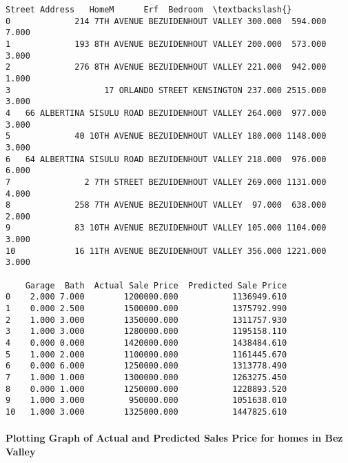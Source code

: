             \begin{tcolorbox}[breakable, size=fbox, boxrule=.5pt, pad at break*=1mm, opacityfill=0]
\begin{Verbatim}[commandchars=\\\{\}]
                                  Street Address   HomeM      Erf  Bedroom  \textbackslash{}
0             214 7TH AVENUE BEZUIDENHOUT VALLEY 300.000  594.000    7.000
1             193 8TH AVENUE BEZUIDENHOUT VALLEY 200.000  573.000    3.000
2             276 8TH AVENUE BEZUIDENHOUT VALLEY 221.000  942.000    1.000
3                   17 ORLANDO STREET KENSINGTON 237.000 2515.000    3.000
4   66 ALBERTINA SISULU ROAD BEZUIDENHOUT VALLEY 264.000  977.000    3.000
5             40 10TH AVENUE BEZUIDENHOUT VALLEY 180.000 1148.000    3.000
6   64 ALBERTINA SISULU ROAD BEZUIDENHOUT VALLEY 218.000  976.000    6.000
7               2 7TH STREET BEZUIDENHOUT VALLEY 269.000 1131.000    4.000
8             258 7TH AVENUE BEZUIDENHOUT VALLEY  97.000  638.000    2.000
9             83 10TH AVENUE BEZUIDENHOUT VALLEY 105.000 1104.000    3.000
10            16 11TH AVENUE BEZUIDENHOUT VALLEY 356.000 1221.000    3.000

    Garage  Bath  Actual Sale Price  Predicted Sale Price
0    2.000 7.000        1200000.000           1136949.610
1    0.000 2.500        1500000.000           1375792.990
2    1.000 3.000        1350000.000           1311757.930
3    1.000 3.000        1280000.000           1195158.110
4    0.000 0.000        1420000.000           1438484.610
5    1.000 2.000        1100000.000           1161445.670
6    0.000 6.000        1250000.000           1313778.490
7    1.000 1.000        1300000.000           1263275.450
8    0.000 1.000        1250000.000           1228893.520
9    1.000 3.000         950000.000           1051638.010
10   1.000 3.000        1325000.000           1447825.610
\end{Verbatim}
\end{tcolorbox}
        
    \hypertarget{plotting-graph-of-actual-and-predicted-sales-price-for-homes-in-bez-valley}{%
\paragraph{Plotting Graph of Actual and Predicted Sales Price for homes
in Bez
Valley}\label{plotting-graph-of-actual-and-predicted-sales-price-for-homes-in-bez-valley}}


